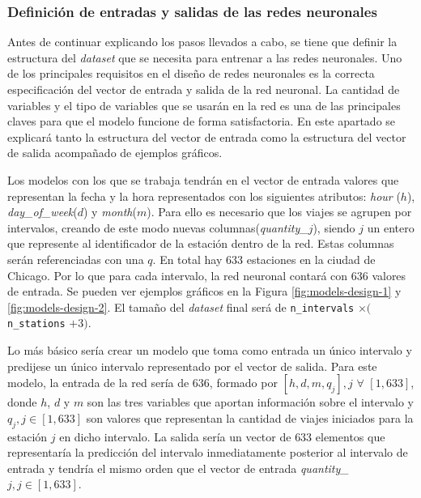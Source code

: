 \subsubsection{Definición de entradas y salidas de las redes neuronales}\label{inputs-outputs}

Antes de continuar explicando los pasos llevados a cabo, se tiene que definir la estructura del \textit{dataset} que se necesita para entrenar a las redes neuronales. Uno de los principales requisitos en el diseño de redes neuronales es la correcta especificación del vector de entrada y salida de la red neuronal. La cantidad de variables y el tipo de variables que se usarán en la red es una de las principales claves para que el modelo funcione de forma satisfactoria. En este apartado se explicará tanto la estructura del vector de entrada como la estructura del vector de salida acompañado de ejemplos gráficos.
\newline

Los modelos con los que se trabaja tendrán en el vector de entrada valores que representan la fecha y la hora representados con los siguientes atributos: \textit{hour} ($h$), \textit{day\_of\_week}($d$) y \textit{month}($m$). Para ello es necesario que los viajes se agrupen por intervalos, creando de este modo nuevas columnas(\textit{quantity\_$j$}), siendo $j$ un entero que represente al identificador de la estación dentro de la red. Estas columnas serán referenciadas con una $q$. En total hay $633$ estaciones en la ciudad de Chicago. Por lo que para cada intervalo, la red neuronal contará con $636$ valores de entrada. Se pueden ver ejemplos gráficos en la Figura \ref{fig:models-design-1} y \ref{fig:models-design-2}. El tamaño del \textit{dataset} final será de \small\verb|n_intervals| $\times ($ \small\verb|n_stations| $+ 3)$.
\newline

Lo más básico sería crear un modelo que toma como entrada un único intervalo y predijese un único intervalo representado por el vector de salida. Para este modelo, la entrada de la red sería de $636$, formado por $[h, d, m, q_j], j$ $ \forall$ $[1, 633]$, donde $h$, $d$ y $m$ son las tres variables que aportan información sobre el intervalo y \textit{$q_j, j\in [1, 633]$} son valores que representan la cantidad de viajes iniciados para la estación $j$ en dicho intervalo. La salida sería un vector de $633$ elementos que representaría la predicción del intervalo inmediatamente posterior al intervalo de entrada y tendría el mismo orden que el vector de entrada \textit{quantity\_$j, j\in [1, 633]$}.
\newline

